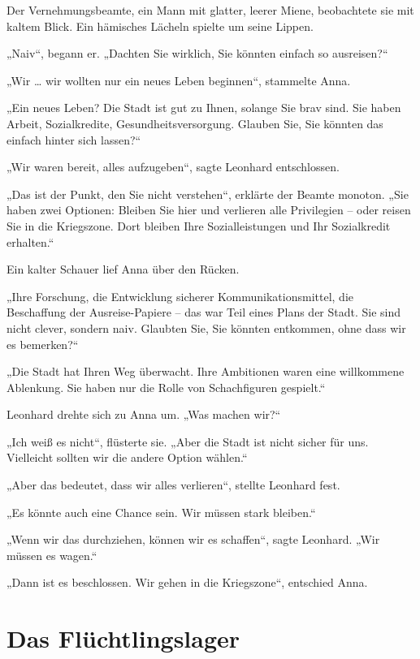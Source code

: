 \documentclass[
]{article}
\begin{document}
Der Vernehmungsbeamte, ein Mann mit glatter, leerer Miene, beobachtete sie mit kaltem Blick. Ein hämisches Lächeln spielte um seine Lippen.

„Naiv``, begann er. „Dachten Sie wirklich, Sie könnten einfach so ausreisen?{\kern0pt}``

„Wir \ldots{} wir wollten nur ein neues Leben beginnen``, stammelte Anna.

„Ein neues Leben? Die Stadt ist gut zu Ihnen, solange Sie brav sind. Sie haben Arbeit, Sozialkredite, Gesundheitsversorgung. Glauben Sie, Sie könnten das einfach hinter sich lassen?{\kern0pt}``

„Wir waren bereit, alles aufzugeben``, sagte Leonhard entschlossen.

„Das ist der Punkt, den Sie nicht verstehen``, erklärte der Beamte monoton. „Sie haben zwei Optionen: Bleiben Sie hier und verlieren alle Privilegien -- oder reisen Sie in die Kriegszone. Dort bleiben Ihre Sozialleistungen und Ihr Sozialkredit erhalten.``

Ein kalter Schauer lief Anna über den Rücken.

„Ihre Forschung, die Entwicklung sicherer Kommunikationsmittel, die Beschaffung der Ausreise-Papiere -- das war Teil eines Plans der Stadt. Sie sind nicht clever, sondern naiv. Glaubten Sie, Sie könnten entkommen, ohne dass wir es bemerken?{\kern0pt}``

„Die Stadt hat Ihren Weg überwacht. Ihre Ambitionen waren eine willkommene Ablenkung. Sie haben nur die Rolle von Schachfiguren gespielt.``

Leonhard drehte sich zu Anna um. „Was machen wir?{\kern0pt}``

„Ich weiß es nicht``, flüsterte sie. „Aber die Stadt ist nicht sicher für uns. Vielleicht sollten wir die andere Option wählen.``

„Aber das bedeutet, dass wir alles verlieren``, stellte Leonhard fest.

„Es könnte auch eine Chance sein. Wir müssen stark bleiben.``

„Wenn wir das durchziehen, können wir es schaffen``, sagte Leonhard. „Wir müssen es wagen.``

„Dann ist es beschlossen. Wir gehen in die Kriegszone``, entschied Anna.

\section{Das Flüchtlingslager}\label{das-fluxfcchtlingslager}
\end{document}
